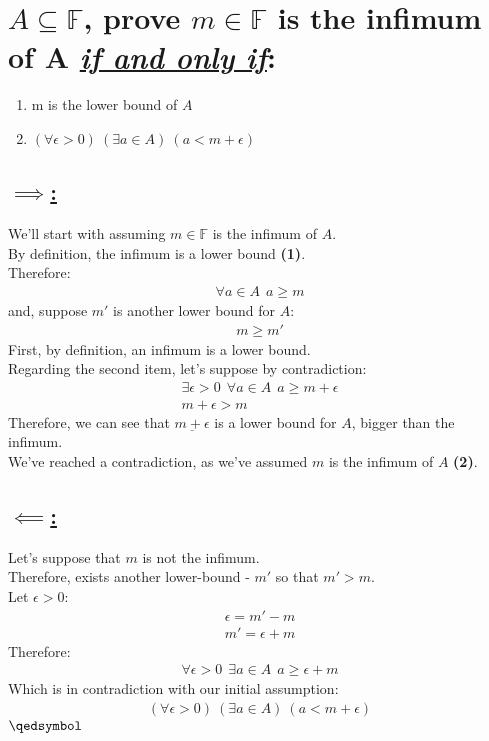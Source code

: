 \documentclass[a4paper, 12pt]{article}
\newcommand{\sub}[1]{\subsection{\underline{#1}}}
\newcommand{\F}{\ensuremath{\mathbb{F}}}
\newcommand{\eq}[1]{\begin{align*}#1\end{align*}}
\renewcommand{\qed}{\hfill\(\qedsymbol\)}
\begin{document}
\begin{titlepage}
\end{titlepage}

\section{
$A\subseteq\F$, prove $m\in\F$ is the infimum of A \underline{\textit{if and only if}}:}
\begin{enumerate}
    \item m is the lower bound of $A$
    \item $(\forall\epsilon>0)~(\exists{a}\in{A})~(a<m+\epsilon)$
\end{enumerate}
\sub{$\implies$:}
We'll start with assuming $m\in\F$ is the infimum of $A$.\\
By definition, the infimum is a lower bound \textbf{(1)}.\\
Therefore: \eq{\forall{a}\in{A}~~a\geq{m}}
and, suppose $m'$ is another lower bound for $A$: \eq{m\geq{m'}}
First, by definition, an infimum is a lower bound.\\
Regarding the second item, let's suppose by contradiction:
\eq{\exists\epsilon>0~~\forall{a}\in{A}~~a\geq{m+\epsilon}\\m+\epsilon>m}
Therefore, we can see that $\underline{m+\epsilon}$ is a lower bound for $A$, bigger than the infimum.\\
We've reached a contradiction, as we've assumed $m$ is the infimum of $A$ \textbf{(2)}.
\sub{$\impliedby$:}
Let's suppose that $m$ is not the infimum.\\
Therefore, exists another lower-bound - $m'$ so that $m'>m$.\\
Let $\epsilon>0$: \eq{\epsilon=m'-m\\m'=\epsilon+m}
Therefore: \eq{\forall\epsilon>0~~\exists{a}\in{A}~~a\geq\epsilon+m}
Which is in contradiction with our initial assumption: \eq{(\forall\epsilon>0)~(\exists{a}\in{A})~(a<m+\epsilon)}
\qed\pagebreak

\end{document}
